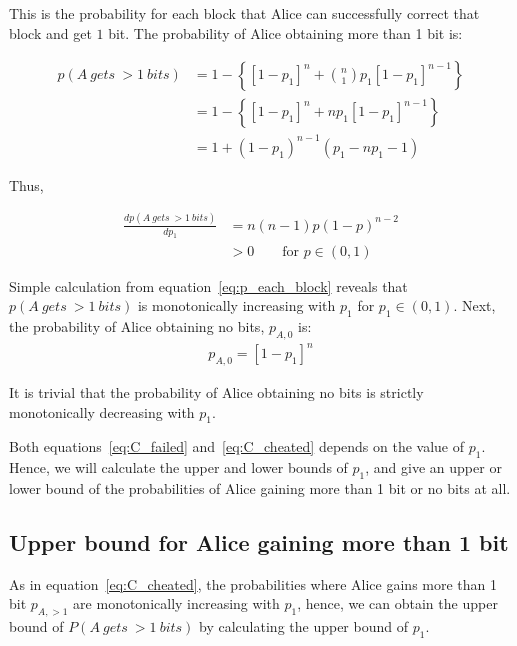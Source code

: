 \documentclass[%
 reprint,
superscriptaddress,
 amsmath,amssymb,
 aps,
]{revtex4-2}
\begin{document}
This is the probability for each block that Alice can successfully correct that block and get $1$ bit. The probability of Alice obtaining more than 1 bit is:

\begin{equation}
\begin{split}
    p(A\ gets\ > 1\ bits) &= 1-\left\{[1-p_1]^n+ \binom{n}{1} p_1[1-p_1]^{n-1}\right\}\\ 
    &= 1-\left\{[1-p_1]^n+np_1[1-p_1]^{n-1}\right\}\\
    &=1 + (1 - p_1)^{n-1} (p_1 - n p_1 - 1)
\end{split}
\label{eq:C_cheated}
\end{equation}

Thus, 

\begin{equation}
\begin{split}
    \frac{dp(A\ gets\ > 1\ bits)}{dp_1}&=n(n-1)p(1 - p)^{n-2}\\
    &>0\qquad \text{for $p\in(0, 1)$}
\end{split}
\end{equation}

Simple calculation from equation~\ref{eq:p_each_block} reveals that $p(A\ gets\ > 1\ bits)$ is monotonically increasing with $p_1$ for $p_1\in(0, 1)$. Next, the probability of Alice obtaining no bits, $p_{A, 0}$ is:
\begin{equation}
\begin{split}
    p_{A, 0} =[1-p_1]^n
    \label{eq:C_failed}
\end{split}
\end{equation}

It is trivial that the probability of Alice obtaining no bits is strictly monotonically decreasing with $p_1$.

Both equations~\ref{eq:C_failed} and~\ref{eq:C_cheated} depends on the value of $p_1$. Hence, we will calculate the upper and lower bounds of $p_1$, and give an upper or lower bound of the probabilities of Alice gaining more than 1 bit or no bits at all.

\subsection{Upper bound for Alice gaining more than 1 bit}
\label{sec:Alice_get_more_info}
As in equation~\ref{eq:C_cheated}, the probabilities where Alice gains more than 1 bit $p_{A, >1}$ are monotonically increasing with $p_1$, hence, we can obtain the upper bound of $P(A\ gets\ > 1\ bits)$ by calculating the upper bound of $p_1$.
\end{document}
